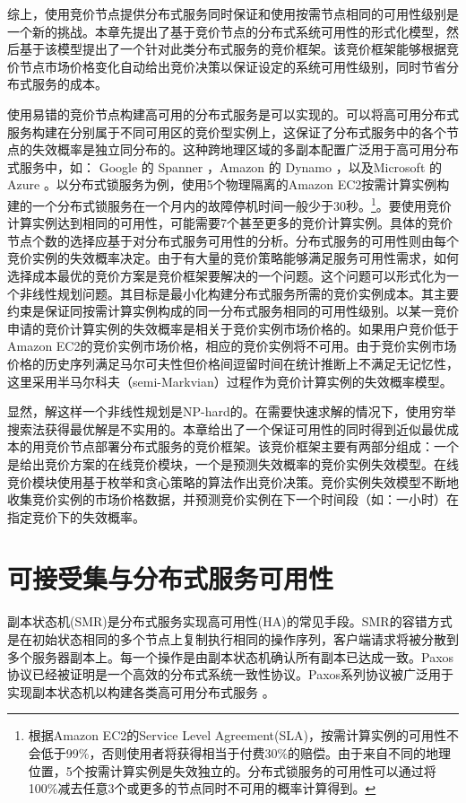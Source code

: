 综上，使用竞价节点提供分布式服务同时保证和使用按需节点相同的可用性级别是一个新的挑战。本章先提出了基于竞价节点的分布式系统可用性的形式化模型，然后基于该模型提出了一个针对此类分布式服务的竞价框架。该竞价框架能够根据竞价节点市场价格变化自动给出竞价决策以保证设定的系统可用性级别，同时节省分布式服务的成本。

使用易错的竞价节点构建高可用的分布式服务是可以实现的。可以将高可用分布式服务构建在分别属于不同可用区的竞价型实例上，这保证了分布式服务中的各个节点的失效概率是独立同分布的。这种跨地理区域的多副本配置广泛用于高可用分布式服务中，如： Google 的 Spanner \cite{Corbett:2012:SGG:2387880.2387905}，Amazon 的 Dynamo \cite{DeCandia:2007:DAH:1294261.1294281}，以及Microsoft 的 Azure \cite{Calder:2011:WAS:2043556.2043571}。以分布式锁服务为例，使用5个物理隔离的Amazon EC2按需计算实例构建的一个分布式锁服务在一个月内的故障停机时间一般少于30秒。\footnote{根据Amazon EC2的Service Level Agreement(SLA)，按需计算实例的可用性不会低于99\%，否则使用者将获得相当于付费30\%的赔偿。由于来自不同的地理位置，5个按需计算实例是失效独立的。分布式锁服务的可用性可以通过将100\%减去任意3个或更多的节点同时不可用的概率计算得到。}。要使用竞价计算实例达到相同的可用性，可能需要7个甚至更多的竞价计算实例。具体的竞价节点个数的选择应基于对分布式服务可用性的分析。分布式服务的可用性则由每个竞价实例的失效概率决定。由于有大量的竞价策略能够满足服务可用性需求，如何选择成本最优的竞价方案是竞价框架要解决的一个问题。这个问题可以形式化为一个非线性规划问题。其目标是最小化构建分布式服务所需的竞价实例成本。其主要约束是保证同按需计算实例构成的同一分布式服务相同的可用性级别。以某一竞价申请的竞价计算实例的失效概率是相关于竞价实例市场价格的。如果用户竞价低于Amazon EC2的竞价实例市场价格，相应的竞价实例将不可用。由于竞价实例市场价格的历史序列满足马尔可夫性但价格间逗留时间在统计推断上不满足无记忆性，这里采用半马尔科夫（semi-Markvian）过程作为竞价计算实例的失效概率模型。

显然，解这样一个非线性规划是NP-hard的。在需要快速求解的情况下，使用穷举搜索法获得最优解是不实用的。本章给出了一个保证可用性的同时得到近似最优成本的用竞价节点部署分布式服务的竞价框架。该竞价框架主要有两部分组成：一个是给出竞价方案的在线竞价模块，一个是预测失效概率的竞价实例失效模型。在线竞价模块使用基于枚举和贪心策略的算法作出竞价决策。竞价实例失效模型不断地收集竞价实例的市场价格数据，并预测竞价实例在下一个时间段（如：一小时）在指定竞价下的失效概率。

\section{可接受集与分布式服务可用性}
\label{sec:jupiter_dist_basis}
副本状态机(SMR)是分布式服务实现高可用性(HA)的常见手段。SMR的容错方式是在初始状态相同的多个节点上复制执行相同的操作序列，客户端请求将被分散到多个服务器副本上。每一个操作是由副本状态机确认所有副本已达成一致。Paxos \cite{lamport2001paxos}协议已经被证明是一个高效的分布式系统一致性协议。Paxos系列协议被广泛用于实现副本状态机以构建各类高可用分布式服务 \cite{Bolosky:2011:PRS:1972457.1972472, Burrows:2006:CLS:1298455.1298487, Mu:2014:PME:2600212.2600218}。

